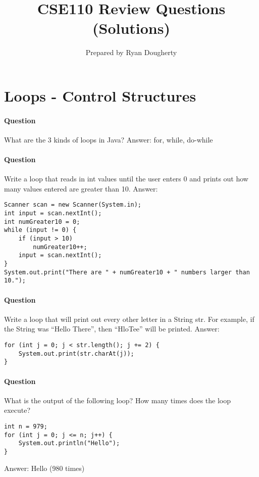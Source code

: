 \documentclass{article}
\title{CSE110 Review Questions (Solutions)}
\author{Prepared by Ryan Dougherty}
\date{}
\begin{document}
\maketitle

\section{Loops - Control Structures}


\setcounter{question_num}{1}

\setcounter{question_num}{1}
\paragraph{Question }
What are the 3 kinds of loops in Java? {\color{red}Answer: for, while, do-while}

\addtocounter{question_num}{1}
\paragraph{Question }
Write a loop that reads in int values until the user enters 0 and prints out how many values entered are greater than 10.
\newline
{\color{red}Answer:}
\begin{lstlisting}
Scanner scan = new Scanner(System.in);
int input = scan.nextInt();
int numGreater10 = 0;
while (input != 0) {
	if (input > 10)
		numGreater10++;
	input = scan.nextInt();
}
System.out.print("There are " + numGreater10 + " numbers larger than 10.");
\end{lstlisting}

\addtocounter{question_num}{1}
\paragraph{Question }
Write a loop that will print out every other letter in a String str. For example, if the String was \enquote{Hello There}, then \enquote{HloTee} will be printed.
\newline
{\color{red}Answer:}
\begin{lstlisting}
for (int j = 0; j < str.length(); j += 2) {
	System.out.print(str.charAt(j));
}
\end{lstlisting}

\addtocounter{question_num}{1}
\paragraph{Question }
What is the output of the following loop? How many times does the loop execute?
\begin{lstlisting}
int n = 979;
for (int j = 0; j <= n; j++) {
	System.out.println("Hello");
}
\end{lstlisting}
{\color{red}Answer: Hello (980 times)}
\end{document}
